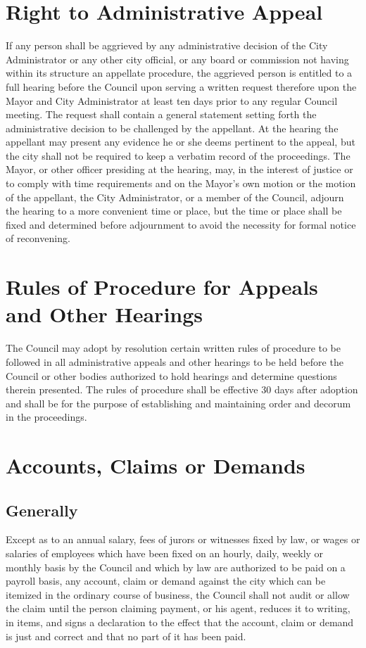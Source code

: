 \section{Right to Administrative Appeal}
If any person shall be aggrieved by any administrative decision of the City Administrator or any other city official, or any board or commission not having within its structure an appellate procedure, the aggrieved person is entitled to a full hearing before the Council upon serving a written request therefore upon the Mayor and City Administrator at least ten days prior to any regular Council meeting. The request shall contain a general statement setting forth the administrative decision to be challenged by the appellant. At the hearing the appellant may present any evidence he or she deems pertinent to the appeal, but the city shall not be required to keep a verbatim record of the proceedings. The Mayor, or other officer presiding at the hearing, may, in the interest of justice or to comply with time requirements and on the Mayor’s own motion or the motion of the appellant, the City Administrator, or a member of the Council, adjourn the hearing to a more convenient time or place, but the time or place shall be fixed and determined before adjournment to avoid the necessity for formal notice of reconvening.

\section{Rules of Procedure for Appeals and Other Hearings}
The Council may adopt by resolution certain written rules of procedure to be followed in all administrative appeals and other hearings to be held before the Council or other bodies authorized to hold hearings and determine questions therein presented.  The rules of procedure shall be effective 30 days after adoption and shall be for the purpose of establishing and maintaining order and decorum in the proceedings.

\section{Accounts, Claims or Demands}
\subsection{Generally} Except as to an annual salary, fees of jurors or witnesses fixed by law, or wages or salaries of employees which have been fixed on an hourly, daily, weekly or monthly basis by the Council and which by law are authorized to be paid on a payroll basis, any account, claim or demand against the city which can be itemized in the ordinary course of business, the Council shall not audit or allow the claim until the person claiming payment, or his agent, reduces it to writing, in items, and signs a declaration to the effect that the account, claim or demand is just and correct and that no part of it has been paid.
